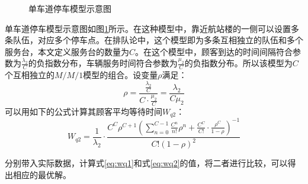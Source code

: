 \documentclass{cumcm}
\begin{document}
\begin{enumerate}[(1)]
\begin{figure}[H]
		\caption{单车道停车模型示意图}
		\label{fi:problem3single}
	\end{figure}
	单车道停车模型示意图如图\ref{fi:problem3single}所示。在这种模型中，靠近航站楼的一侧可以设置多条队伍，对应多个停车点。在排队论中，这个模型即为多条互相独立的队伍和多个服务台，本文定义服务台的数量为$C$。在这个模型中，顾客到达的时间间隔符合参数为$\frac{\lambda_2}{C}$的负指数分布，车辆服务时间符合参数为$\frac{\mu_2}{C}$的负指数分布。所以该模型为$C$个互相独立的$M/M/1$模型的组合。设变量$\rho$满足：
	\begin{equation}
		\rho=\frac{\frac{\lambda_2}{C}}{C\cdot\frac{\mu_2}{C}}=\frac{\lambda_2}{C\mu_2}
		\label{eq:rho}
	\end{equation}
	可以用如下的公式\cite{queuebook}计算其顾客平均等待时间$W_{q2}$：
	\begin{equation}
		W_{q2}=\frac{1}{\lambda_2}\cdot\frac{C^C\rho^{C+1}\left(\sum\limits_{n=0}^{C-1}\frac{C^n}{n!}\rho^n+\frac{C^C}{C!}\cdot\frac{\rho^C}{1-\rho}\right)^{-1}}{C!\left(1-\rho\right)^2}
		\label{eq:wq2}
	\end{equation}
\end{enumerate}
分别带入实际数据，计算式\ref{eq:wq1}和式\ref{eq:wq2}的值，将二者进行比较，可以得出相应的最优解。
\end{document}
